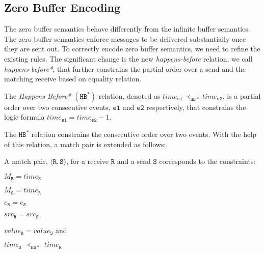 





\subsection{Zero Buffer Encoding}
The zero buffer semantics behave differently from the infinite buffer semantics.  The zero buffer semantics enforce messages to be delivered substantially once they are sent out. To correctly encode zero buffer semantics, we need to refine the existing rules. The significant change is the new \emph{happens-before} relation, we call \textit{happens-before*}, that further constrains the partial order over a send and the matching receive based on equality relation. 

\begin{definition}
The \emph{Happens-Before*} $(\mathtt{HB^*})$ relation, denoted as
$\mathit{time}_\mathtt{e1} \mathrm{\prec_\mathtt{HB*}} \mathit{time}_\mathtt{e2}$, is a partial order over two consecutive events, $\mathtt{e1}$ and $\mathtt{e2}$ respectively, that constrains the logic formula $\mathit{time}_\mathtt{e1} =  \mathit{time}_\mathtt{e2} - 1$.
\label{def:hb*}
\end{definition}

The $\mathtt{HB^*}$ relation constrains the consecutive order over two events. With the help of this relation, a match pair is extended as follows: 

\begin{definition} \label{def:match*}
A match pair, $\langle\mathtt{R}, \mathtt{S}\rangle$, for a receive
$\mathtt{R}$ and a send $\mathtt{S}$ corresponds to the constraints:
\begin{compactenum}
\item $M_{\mathtt{R}} = \mathit{time}_{\mathtt{S}}$
\item $M_{\mathtt{S}} = \mathit{time}_{\mathtt{R}}$
\item $e_{\mathtt{R}} = e_{\mathtt{S}}$
\item $src_\mathtt{R} = src_\mathtt{S}$
\item $\mathit{value}_{\mathtt{R}} = \mathit{value}_{\mathtt{S}}$ and
\item $\mathit{time}_{\mathtt{S}}\ \mathrm{\prec_\mathtt{HB*}}\ \mathit{time}_{\mathtt{R}}$
\end{compactenum}
\end{definition}

